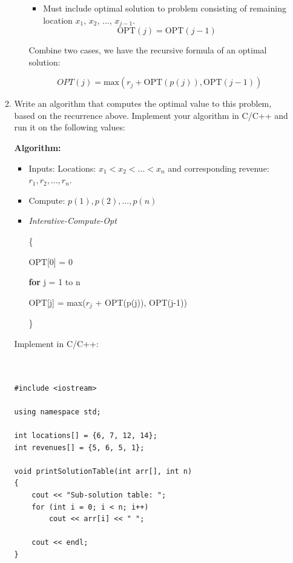 \documentclass[11pts]{report}
\begin{document}
\begin{enumerate}
\begin{enumerate}
\begin{enumerate}
\begin{itemize}
	\item Must include optimal solution to problem consisting of remaining location $x_1$, $x_2$, ..., $x_{j - 1}$.
	\begin{equation*}
	\text{OPT}(j) = \text{OPT}(j - 1)
	\end{equation*}	 
\end{itemize}

Combine two cases, we have the recursive formula of an optimal solution:

\begin{equation*}
	OPT(j) = \text{max}(r_j + \text{OPT}(p(j)), \text{OPT}(j - 1))
\end{equation*}

\end{enumerate}

\item Write an algorithm that computes the optimal value to this problem, based on the recurrence above. Implement your algorithm in C/C++ and run it on the following values:

\textbf{Algorithm:}

\begin{itemize}

\item Inputs: Locations: $x_1 < x_2 < ... < x_n$ and corresponding revenue: $r_1, r_2, ..., r_n$.
\item Compute: $p(1), p(2), ..., p(n)$
\item \textit{Interative-Compute-Opt}
\par \{
\par \quad OPT[0] = 0
\par \quad \textbf{for} j = 1 to n
\par \qquad OPT[j] = max($r_j$ + OPT(p(j)), OPT(j-1))
\par \} 

\end{itemize}

Implement in C/C++:

\begin{lstlisting}


#include <iostream>

using namespace std;

int locations[] = {6, 7, 12, 14}; 
int revenues[] = {5, 6, 5, 1};

void printSolutionTable(int arr[], int n) 
{ 
    cout << "Sub-solution table: ";
    for (int i = 0; i < n; i++) 
        cout << arr[i] << " "; 

    cout << endl;
}


\end{lstlisting}
\end{enumerate}
\end{enumerate}
\end{document}
